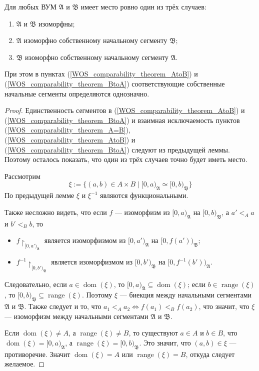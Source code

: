\documentclass[12pt,a4paper]{article}
\DeclareMathOperator{\dom}{dom}
\DeclareMathOperator{\range}{range}
\begin{document}
    \begin{theorem}
        Для любых ВУМ $\mathfrak{A}$ и $\mathfrak{B}$ имеет место ровно один из трёх случаев:
        \begin{enumerate}
            \item \label{WOS_comparability_theorem_A=B} $\mathfrak{A}$ и $\mathfrak{B}$ изоморфны;
            \item \label{WOS_comparability_theorem_AtoB} $\mathfrak{A}$ изоморфно собственному начальному сегменту $\mathfrak{B}$;
            \item \label{WOS_comparability_theorem_BtoA} $\mathfrak{B}$ изоморфно собственному начальному сегменту $\mathfrak{A}$.
        \end{enumerate}

        При этом в пунктах (\ref{WOS_comparability_theorem_AtoB}) и (\ref{WOS_comparability_theorem_BtoA}) соответствующие собственные начальные сегменты определяются однозначно.
    \end{theorem}

    \begin{proof}
        Единственность сегментов в (\ref{WOS_comparability_theorem_AtoB}) и (\ref{WOS_comparability_theorem_BtoA}) и взаимная исключаемость пунктов (\ref{WOS_comparability_theorem_A=B}), (\ref{WOS_comparability_theorem_AtoB}) и (\ref{WOS_comparability_theorem_BtoA}) следуют из предыдущей леммы. Поэтому осталось показать, что один из трёх случаев точно будет иметь место.

        Рассмотрим
        \[\xi := \{(a, b) \in A \times B \mid [0, a)_\mathfrak{A} \simeq [0, b)_\mathfrak{B}\}\]
        По предыдущей лемме $\xi$ и $\xi^{-1}$ являются функциональными.

        Также несложно видеть, что если $f$ --- изоморфизм из $[0, a)_\mathfrak{A}$ на $[0, b)_\mathfrak{B}$, а $a' <_A a$ и $b' <_B b$, то
        \begin{itemize}
            \item $f\upharpoonright_{[0, a')_\mathfrak{A}}$ является изоморфизмом из $[0, a')_\mathfrak{A}$ на $[0, f(a'))_\mathfrak{B}$;
            \item $f^{-1}\upharpoonright_{[0, b')_\mathfrak{B}}$ является изоморфизмом из $[0, b')_\mathfrak{B}$ на $[0, f^{-1}(b'))_\mathfrak{A}$.
        \end{itemize}
        Следовательно, если $a \in \dom(\xi)$, то $[0, a)_\mathfrak{A} \subseteq \dom(\xi)$; если $b \in \range(\xi)$, то $[0, b)_\mathfrak{B} \subseteq \range(\xi)$. Поэтому $\xi$ --- биекция между начальными сегментами $\mathfrak{A}$ и $\mathfrak{B}$. Также следует и то, что $a_1 <_A a_2 \Leftrightarrow f(a_1) <_B f(a_2)$, что значит, что $\xi$ --- изоморфизм между начальными сегментами $\mathfrak{A}$ и $\mathfrak{B}$.

        Если $\dom(\xi) \neq A$, а $\range(\xi) \neq B$, то существуют $a \in A$ и $b \in B$, что $\dom(\xi) = [0, a)_\mathfrak{A}$, а $\range(\xi) = [0, b)_\mathfrak{B}$. Это значит, что $(a, b) \in \xi$ --- противоречие. Значит $\dom(\xi) = A$ или $\range(\xi) = B$, откуда следует желаемое.
    \end{proof}
\end{document}
